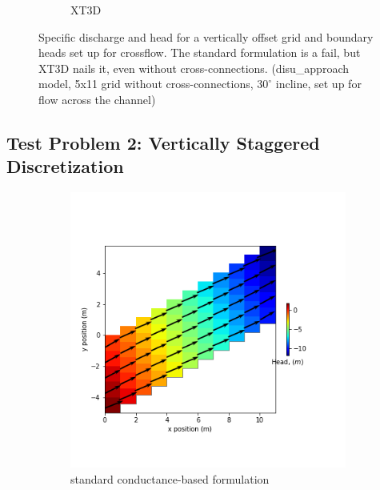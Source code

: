\documentclass{article}
\begin{document}
\begin{figure}[H]
\begin{subfigure}{0.4\textwidth}
	\caption{XT3D}
	\label{fig:disu-x-nocc-cf-head}
\end{subfigure}
\caption{Specific discharge and head for a vertically offset grid and boundary heads set up for crossflow. The standard formulation is a fail, but XT3D nails it, even without cross-connections. (disu\_approach model, 5x11 grid without cross-connections, $30^{\circ}$ incline, set up for flow across the channel)}
\label{fig:figures}
\end{figure}

\subsection{Test Problem 2: Vertically Staggered Discretization}

\begin{figure}[H]
\centering
\begin{subfigure}{0.4\textwidth}
	\includegraphics[width=\textwidth]{../figures/disu-s-cc-head.png}
	\caption{standard conductance-based formulation}
	\label{fig:disu-s-cc-head}
\end{subfigure}
\hfill
\begin{subfigure}{0.4\textwidth}

\end{subfigure}
\end{figure}
\end{document}
